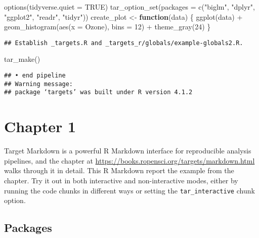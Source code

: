 \documentclass[
]{book}
\newenvironment{Shaded}{\begin{snugshade}}{\end{snugshade}}
\newcommand{\AttributeTok}[1]{\textcolor[rgb]{0.77,0.63,0.00}{#1}}
\newcommand{\ConstantTok}[1]{\textcolor[rgb]{0.00,0.00,0.00}{#1}}
\newcommand{\ControlFlowTok}[1]{\textcolor[rgb]{0.13,0.29,0.53}{\textbf{#1}}}
\newcommand{\DecValTok}[1]{\textcolor[rgb]{0.00,0.00,0.81}{#1}}
\newcommand{\FunctionTok}[1]{\textcolor[rgb]{0.00,0.00,0.00}{#1}}
\newcommand{\NormalTok}[1]{#1}
\newcommand{\OtherTok}[1]{\textcolor[rgb]{0.56,0.35,0.01}{#1}}
\newcommand{\SpecialCharTok}[1]{\textcolor[rgb]{0.00,0.00,0.00}{#1}}
\newcommand{\StringTok}[1]{\textcolor[rgb]{0.31,0.60,0.02}{#1}}
\begin{document}
\begin{Shaded}
\begin{Highlighting}[]
\FunctionTok{options}\NormalTok{(}\AttributeTok{tidyverse.quiet =} \ConstantTok{TRUE}\NormalTok{)}
\FunctionTok{tar\_option\_set}\NormalTok{(}\AttributeTok{packages =} \FunctionTok{c}\NormalTok{(}\StringTok{"biglm"}\NormalTok{, }\StringTok{"dplyr"}\NormalTok{, }\StringTok{"ggplot2"}\NormalTok{, }\StringTok{"readr"}\NormalTok{, }\StringTok{"tidyr"}\NormalTok{))}
\NormalTok{create\_plot }\OtherTok{\textless{}{-}} \ControlFlowTok{function}\NormalTok{(data) \{}
  \FunctionTok{ggplot}\NormalTok{(data) }\SpecialCharTok{+}
    \FunctionTok{geom\_histogram}\NormalTok{(}\FunctionTok{aes}\NormalTok{(}\AttributeTok{x =}\NormalTok{ Ozone), }\AttributeTok{bins =} \DecValTok{12}\NormalTok{) }\SpecialCharTok{+}
    \FunctionTok{theme\_gray}\NormalTok{(}\DecValTok{24}\NormalTok{)}
\NormalTok{\}}
\end{Highlighting}
\end{Shaded}

\begin{verbatim}
## Establish _targets.R and _targets_r/globals/example-globals2.R.
\end{verbatim}

\begin{Shaded}
\begin{Highlighting}[]
\FunctionTok{tar\_make}\NormalTok{()}
\end{Highlighting}
\end{Shaded}

\begin{verbatim}
## • end pipeline
## Warning message:
## package ‘targets’ was built under R version 4.1.2
\end{verbatim}

\hypertarget{chapter-1}{%
\chapter{Chapter 1}\label{chapter-1}}

Target Markdown is a powerful R Markdown interface for reproducible analysis pipelines, and the chapter at \url{https://books.ropensci.org/targets/markdown.html} walks through it in detail. This R Markdown report the example from the chapter. Try it out in both interactive and non-interactive modes, either by running the code chunks in different ways or setting the \texttt{tar\_interactive} chunk option.

\hypertarget{packages}{%
\section{Packages}\label{packages}}
\end{document}

